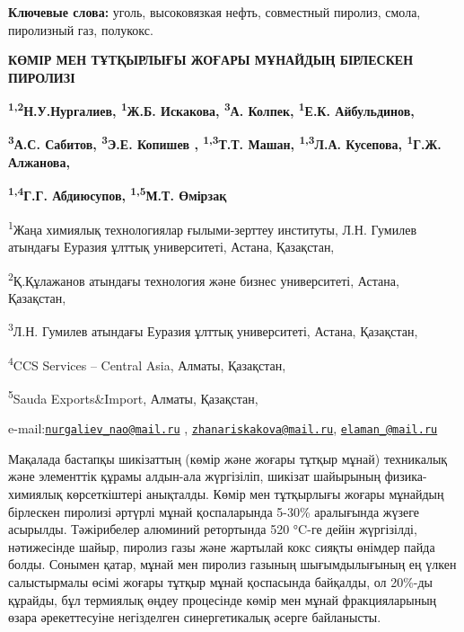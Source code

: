 {\bfseries Ключевые слова:} уголь, высоковязкая нефть, совместный пиролиз,
смола, пиролизный газ, полукокс.

\begin{articleheader}
{\bfseries КӨМІР МЕН ТҰТҚЫРЛЫҒЫ ЖОҒАРЫ МҰНАЙДЫҢ БІРЛЕСКЕН ПИРОЛИЗІ}

{\bfseries \textsuperscript{1,2}Н.У.Нургалиев\textsuperscript{\envelope },
\textsuperscript{1}Ж.Б. Искакова\textsuperscript{\envelope },
\textsuperscript{3}А. Колпек, \textsuperscript{1}Е.К.
Айбульдинов\textsuperscript{\envelope },}

{\bfseries \textsuperscript{3}А.С. Сабитов, \textsuperscript{3}Э.Е. Копишев
, \textsuperscript{1,3}Т.Т. Машан, \textsuperscript{1,3}Л.А. Кусепова,
\textsuperscript{1}Г.Ж. Алжанова,}

{\bfseries \textsuperscript{1,4}Г.Г. Абдиюсупов, \textsuperscript{1,5}М.Т.
Өмірзақ}
\end{articleheader}

\begin{affiliation}
\textsuperscript{1}Жаңа химиялық технологиялар ғылыми-зерттеу институты,
Л.Н. Гумилев атындағы Еуразия ұлттық университеті, Астана, Қазақстан,

\textsuperscript{2}Қ.Құлажанов атындағы технология және бизнес
университеті, Астана, Қазақстан,

\textsuperscript{3}Л.Н. Гумилев атындағы Еуразия ұлттық университеті,
Астана, Қазақстан,

\textsuperscript{4}CCS Services -- Central Asia, Алматы, Қазақстан,

\textsuperscript{5}Sauda Exports\&Import, Алматы, Қазақстан,

e-mail:\href{mailto:nurgaliev_nao@mail.ru}{\nolinkurl{nurgaliev\_nao@mail.ru}}
,
\href{mailto:zhanariskakova@mail.ru}{\nolinkurl{zhanariskakova@mail.ru}},
\href{mailto:elaman_@mail.ru}{\nolinkurl{elaman\_@mail.ru}}
\end{affiliation}

Мақалада бастапқы шикізаттың (көмір және жоғары тұтқыр мұнай) техникалық
және элементтік құрамы алдын-ала жүргізіліп, шикізат шайырының
физика-химиялық көрсеткіштері анықталды. Көмір мен тұтқырлығы жоғары
мұнайдың бірлескен пиролизі әртүрлі мұнай қоспаларында 5-30\% аралығында
жүзеге асырылды. Тәжірибелер алюминий ретортында 520 °C-ге дейін
жүргізілді, нәтижесінде шайыр, пиролиз газы және жартылай кокс сияқты
өнімдер пайда болды. Сонымен қатар, мұнай мен пиролиз газының
шығымдылығының ең үлкен салыстырмалы өсімі жоғары тұтқыр мұнай
қоспасында байқалды, ол 20\%-ды құрайды, бұл термиялық өңдеу процесінде
көмір мен мұнай фракцияларының өзара әрекеттесуіне негізделген
синергетикалық әсерге байланысты.

